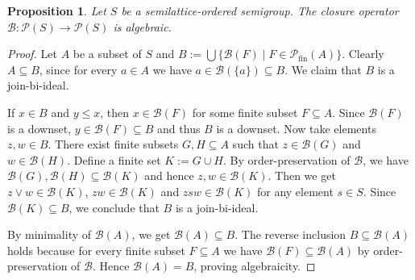 \documentclass[10pt, reqno]{amsart}
\theoremstyle{plain}
\newtheorem{prop}[theorem]{Proposition}
\theoremstyle{definition}
\begin{document}
\begin{prop}\label{join_bi_ideal_closure_is_algebraic}
    Let $S$ be a semilattice-ordered semigroup. The closure operator $\mathcal{B} : \mathcal{P}(S) \rightarrow \mathcal{P}(S)$ is algebraic. 
\end{prop}
\begin{proof}
    Let $A$ be a subset of $S$ and $B := \bigcup\{\mathcal{B}(F) \mid F \in \mathcal{P}_\mathrm{fin}(A)\}$. Clearly $A \subseteq B$, since for every $a \in A$ we have $a \in \mathcal{B}(\{a\}) \subseteq B$. We claim that $B$ is a join-bi-ideal. 
    
    If $x \in B$ and $y \leqslant x$, then $x \in \mathcal{B}(F)$ for some finite subset $F \subseteq A$. Since $\mathcal{B}(F)$ is a downset, $y\in\mathcal{B}(F) \subseteq B$ and thus $B$ is a downset. Now take elements $z, w \in B$. There exist finite subsets $G, H \subseteq A$ such that $z \in \mathcal{B}(G)$ and $w \in \mathcal{B}(H)$. Define a finite set $K := G \cup H$. By order-preservation of $\mathcal{B}$, we have $\mathcal{B}(G), \mathcal{B}(H) \subseteq \mathcal{B}(K)$ and hence $z, w \in \mathcal{B}(K)$. Then we get $z \lor w \in \mathcal{B}(K)$, $zw \in \mathcal{B}(K)$ and $zsw \in \mathcal{B}(K)$ for any element $s \in S$. Since $\mathcal{B}(K) \subseteq B$, we conclude that $B$ is a join-bi-ideal. 
    
    By minimality of $\mathcal{B}(A)$, we get $\mathcal{B}(A) \subseteq B$. The reverse inclusion $B \subseteq \mathcal{B}(A)$ holds because for every finite subset $F \subseteq A$ we have $\mathcal{B}(F) \subseteq \mathcal{B}(A)$ by order-preservation of $\mathcal{B}$. Hence $\mathcal{B}(A) = B$, proving algebraicity. 
\end{proof}
\end{document}
